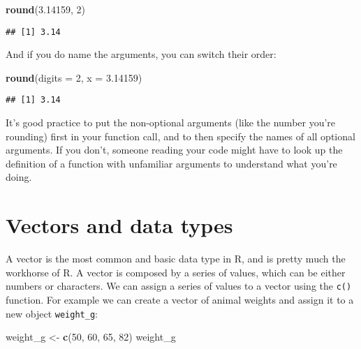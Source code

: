 \documentclass[]{book}
\newenvironment{Shaded}{\begin{snugshade}}{\end{snugshade}}
\newcommand{\KeywordTok}[1]{\textcolor[rgb]{0.13,0.29,0.53}{\textbf{#1}}}
\newcommand{\DataTypeTok}[1]{\textcolor[rgb]{0.13,0.29,0.53}{#1}}
\newcommand{\DecValTok}[1]{\textcolor[rgb]{0.00,0.00,0.81}{#1}}
\newcommand{\FloatTok}[1]{\textcolor[rgb]{0.00,0.00,0.81}{#1}}
\newcommand{\StringTok}[1]{\textcolor[rgb]{0.31,0.60,0.02}{#1}}
\newcommand{\NormalTok}[1]{#1}
\begin{document}
\begin{Shaded}
\begin{Highlighting}[]
\KeywordTok{round}\NormalTok{(}\FloatTok{3.14159}\NormalTok{, }\DecValTok{2}\NormalTok{)}
\end{Highlighting}
\end{Shaded}

\begin{verbatim}
## [1] 3.14
\end{verbatim}

And if you do name the arguments, you can switch their order:

\begin{Shaded}
\begin{Highlighting}[]
\KeywordTok{round}\NormalTok{(}\DataTypeTok{digits =} \DecValTok{2}\NormalTok{, }\DataTypeTok{x =} \FloatTok{3.14159}\NormalTok{)}
\end{Highlighting}
\end{Shaded}

\begin{verbatim}
## [1] 3.14
\end{verbatim}

It's good practice to put the non-optional arguments (like the number
you're rounding) first in your function call, and to then specify the
names of all optional arguments. If you don't, someone reading your code
might have to look up the definition of a function with unfamiliar
arguments to understand what you're doing.

\section{Vectors and data types}\label{vectors-and-data-types}

A vector is the most common and basic data type in R, and is pretty much
the workhorse of R. A vector is composed by a series of values, which
can be either numbers or characters. We can assign a series of values to
a vector using the \texttt{c()} function. For example we can create a
vector of animal weights and assign it to a new object
\texttt{weight\_g}:

\begin{Shaded}
\begin{Highlighting}[]
\NormalTok{weight_g <-}\StringTok{ }\KeywordTok{c}\NormalTok{(}\DecValTok{50}\NormalTok{, }\DecValTok{60}\NormalTok{, }\DecValTok{65}\NormalTok{, }\DecValTok{82}\NormalTok{)}
\NormalTok{weight_g}
\end{Highlighting}
\end{Shaded}
\end{document}
